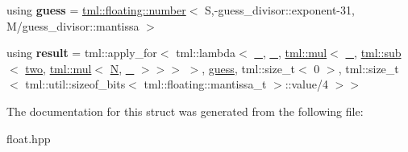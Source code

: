 \begin{DoxyCompactItemize}
\item 
\hypertarget{structtml_1_1reciprocal_3_01tml_1_1floating_1_1number_3_01S_00_01E_00_01M_01_4_01_4_ac4e2b0db8bee612a06334934693b072c}{using {\bfseries guess} = \hyperlink{structtml_1_1floating_1_1number}{tml\+::floating\+::number}$<$ S,-\/guess\+\_\+divisor\+::exponent-\/31, M/guess\+\_\+divisor\+::mantissa $>$}\label{structtml_1_1reciprocal_3_01tml_1_1floating_1_1number_3_01S_00_01E_00_01M_01_4_01_4_ac4e2b0db8bee612a06334934693b072c}

\item 
\hypertarget{structtml_1_1reciprocal_3_01tml_1_1floating_1_1number_3_01S_00_01E_00_01M_01_4_01_4_a84713b83f70c7ec03def141c3f482aaf}{using {\bfseries result} = tml\+::apply\+\_\+for$<$ tml\+::lambda$<$ \hyperlink{structtml_1_1placeholder}{\+\_}, \hyperlink{structtml_1_1placeholder}{\+\_}, \hyperlink{structtml_1_1mul}{tml\+::mul}$<$ \hyperlink{structtml_1_1placeholder}{\+\_}, \hyperlink{structtml_1_1sub}{tml\+::sub}$<$ \hyperlink{structtml_1_1floating_1_1number}{two}, \hyperlink{structtml_1_1mul}{tml\+::mul}$<$ \hyperlink{structtml_1_1floating_1_1number}{N}, \hyperlink{structtml_1_1placeholder}{\+\_} $>$$>$$>$ $>$, \hyperlink{structtml_1_1floating_1_1number}{guess}, tml\+::size\+\_\+t$<$ 0 $>$, tml\+::size\+\_\+t$<$ tml\+::util\+::sizeof\+\_\+bits$<$ tml\+::floating\+::mantissa\+\_\+t $>$\+::value/4 $>$$>$}\label{structtml_1_1reciprocal_3_01tml_1_1floating_1_1number_3_01S_00_01E_00_01M_01_4_01_4_a84713b83f70c7ec03def141c3f482aaf}

\end{DoxyCompactItemize}


The documentation for this struct was generated from the following file\+:\begin{DoxyCompactItemize}
\item 
float.\+hpp\end{DoxyCompactItemize}
